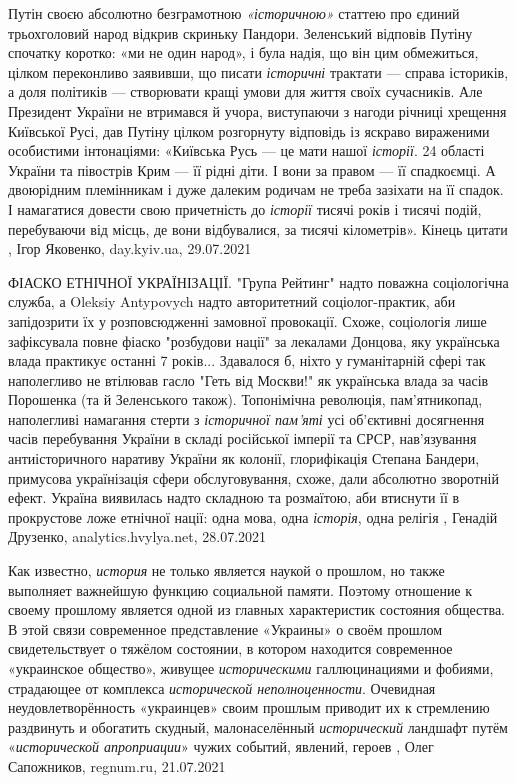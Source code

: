 Путін своєю абсолютно безграмотною \emph{«історичною»} статтею про єдиний трьохголовий
народ відкрив скриньку Пандори.
Зеленський відповів Путіну спочатку коротко: «ми не один народ», і була надія,
що він цим обмежиться, цілком переконливо заявивши, що писати \emph{історичні}
трактати — справа істориків, а доля політиків — створювати кращі умови  для
життя своїх сучасників. Але Президент України не втримався й учора, виступаючи
з нагоди річниці хрещення Київської Русі, дав Путіну  цілком розгорнуту
відповідь із яскраво вираженими особистими інтонаціями:
«Київська Русь — це мати нашої \emph{історії}. 24 області України та півострів Крим —
її рідні діти. І вони за правом — її спадкоємці. А двоюрідним племінникам і
дуже далеким родичам не треба зазіхати на її спадок. І намагатися довести свою
причетність до \emph{історії} тисячі років і тисячі подій, перебуваючи від місць, де
вони відбувалися, за тисячі кілометрів». Кінець цитати
, 
Ігор Яковенко, day.kyiv.ua, 29.07.2021

ФІАСКО ЕТНІЧНОЇ УКРАЇНІЗАЦІЇ. "Група Рейтинг" надто поважна соціологічна
служба, а Oleksiy Antypovych надто авторитетний соціолог-практик, аби
запідозрити їх у розповсюдженні замовної провокації. Схоже, соціологія лише
зафіксувала повне фіаско "розбудови нації" за лекалами Донцова, яку українська
влада практикує останні 7 років...  Здавалося б, ніхто у гуманітарній сфері так
наполегливо не втілював гасло "Геть від Москви!" як українська влада за часів
Порошенка (та й Зеленського також). Топонімічна революція, пам'ятникопад,
наполегливі намагання стерти з \emph{історичної пам'яті} усі об'єктивні досягнення
часів перебування України в складі російської імперії та СРСР, нав'язування
антиісторичного наративу України як колонії, глорифікація Степана Бандери,
примусова українізація сфери обслуговування, схоже, дали абсолютно зворотній
ефект.  Україна виявилась надто складною та розмаїтою, аби втиснути її в
прокрустове ложе етнічної нації: одна мова, одна \emph{історія}, одна релігія
, 
Генадій Друзенко, analytics.hvylya.net, 28.07.2021

Как известно, \emph{история} не только является наукой о прошлом, но также
выполняет важнейшую функцию социальной памяти. Поэтому отношение к своему
прошлому является одной из главных характеристик состояния общества.  В этой
связи современное представление «Украины» о своём прошлом свидетельствует о
тяжёлом состоянии, в котором находится современное «украинское общество»,
живущее \emph{историческими} галлюцинациями и фобиями, страдающее от комплекса
\emph{исторической неполноценности}.  Очевидная неудовлетворённость «украинцев»
своим прошлым приводит их к стремлению раздвинуть и обогатить скудный,
малонаселённый \emph{исторический} ландшафт путём «\emph{исторической
апроприации}» чужих событий, явлений, героев
, 
Олег Сапожников, regnum.ru, 21.07.2021

